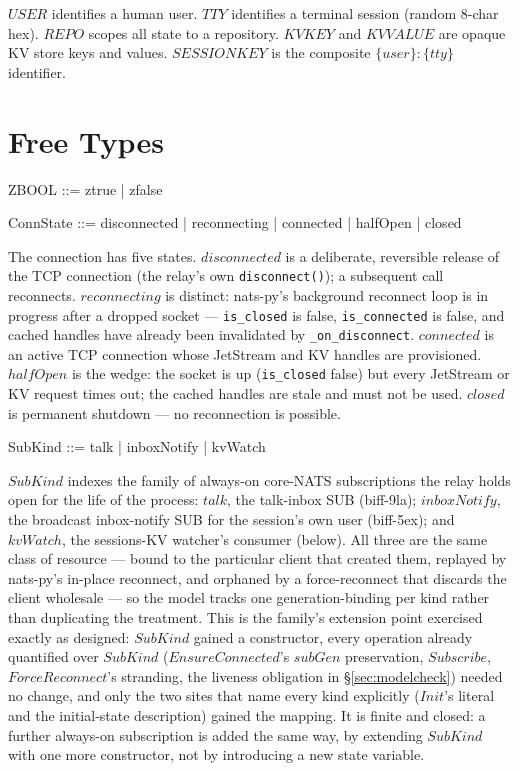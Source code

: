 \documentclass[a4paper,10pt,fleqn]{article}
\begin{document}
$USER$ identifies a human user.  $TTY$ identifies a terminal
session (random 8-char hex).  $REPO$ scopes all state to a
repository.  $KVKEY$ and $KVVALUE$ are opaque KV store keys and
values.  $SESSIONKEY$ is the composite $\{user\}:\{tty\}$ identifier.

\section{Free Types}

\begin{zed}
  ZBOOL ::= ztrue | zfalse
\end{zed}

\begin{zed}
  ConnState ::= disconnected | reconnecting | connected | halfOpen | closed
\end{zed}

The connection has five states.  $disconnected$ is a deliberate,
reversible release of the TCP connection (the relay's own
\texttt{disconnect()}); a subsequent call reconnects.
$reconnecting$ is distinct: nats-py's background reconnect loop is
in progress after a dropped socket --- \texttt{is\_closed} is
false, \texttt{is\_connected} is false, and cached handles have
already been invalidated by \texttt{\_on\_disconnect}.
$connected$ is an active TCP connection whose JetStream and KV
handles are provisioned.  $halfOpen$ is the wedge: the socket is
up (\texttt{is\_closed} false) but every JetStream or KV request
times out; the cached handles are stale and must not be used.
$closed$ is permanent shutdown --- no reconnection is possible.

\begin{zed}
  SubKind ::= talk | inboxNotify | kvWatch
\end{zed}

$SubKind$ indexes the family of always-on core-NATS subscriptions the
relay holds open for the life of the process: $talk$, the talk-inbox SUB
(biff-9la); $inboxNotify$, the broadcast inbox-notify SUB for the
session's own user (biff-5ex); and $kvWatch$, the sessions-KV watcher's
consumer (below).  All three are the same class of resource --- bound to
the particular client that created them, replayed by nats-py's in-place
reconnect, and orphaned by a force-reconnect that discards the client
wholesale --- so the model tracks one generation-binding per kind rather
than duplicating the treatment.  This is the family's extension point
exercised exactly as designed: $SubKind$ gained a constructor, every
operation already quantified over $SubKind$ ($EnsureConnected$'s $subGen$
preservation, $Subscribe$, $ForceReconnect$'s stranding, the liveness
obligation in \S\ref{sec:modelcheck}) needed no change, and only the two
sites that name every kind explicitly ($Init$'s literal and the
initial-state description) gained the mapping.  It is finite and closed:
a further always-on subscription is added the same way, by extending
$SubKind$ with one more constructor, not by introducing a new state
variable.
\end{document}

